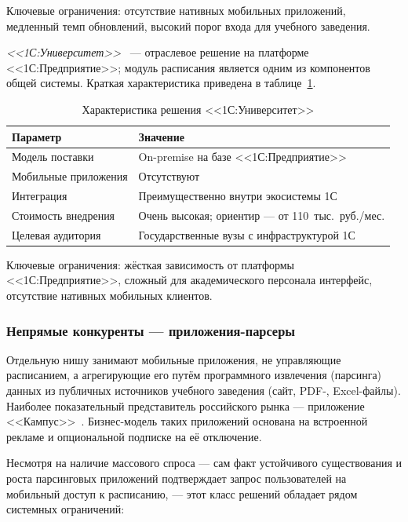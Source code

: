 Ключевые ограничения: отсутствие нативных мобильных приложений, медленный темп обновлений, высокий порог входа для учебного заведения.

\emph{<<1С:Университет>>}~\cite{1c-university} --- отраслевое решение на платформе <<1С:Предприятие>>; модуль расписания является одним из компонентов общей системы. Краткая характеристика приведена в таблице~\ref{tab:1c}.

\begin{table}[h]
  \caption{Характеристика решения <<1С:Университет>>}
  \label{tab:1c}
  \centering
  \begin{tabular}{p{} p{}}
    \toprule
    Параметр & Значение \\
    \midrule
    Модель поставки & On-premise на базе <<1С:Предприятие>> \\
    Мобильные приложения & Отсутствуют \\
    Интеграция & Преимущественно внутри экосистемы 1С \\
    Стоимость внедрения & Очень высокая; ориентир --- от 110~тыс.~руб./мес. \\
    Целевая аудитория & Государственные вузы с инфраструктурой 1С \\
    \bottomrule
  \end{tabular}
\end{table}

Ключевые ограничения: жёсткая зависимость от платформы <<1С:Предприятие>>, сложный для академического персонала интерфейс, отсутствие нативных мобильных клиентов.

\subsubsection{Непрямые конкуренты --- приложения-парсеры}
\label{subsubsec:parsers}

Отдельную нишу занимают мобильные приложения, не управляющие расписанием, а агрегирующие его путём программного извлечения (парсинга) данных из публичных источников учебного заведения (сайт, PDF-, Excel-файлы). Наиболее показательный представитель российского рынка --- приложение <<Кампус>>~\cite{campus-app}. Бизнес-модель таких приложений основана на встроенной рекламе и опциональной подписке на её отключение.

Несмотря на наличие массового спроса --- сам факт устойчивого существования и роста парсинговых приложений подтверждает запрос пользователей на мобильный доступ к расписанию, --- этот класс решений обладает рядом системных ограничений:

